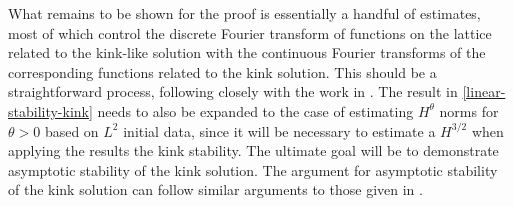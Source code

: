 What remains to be shown for the proof is essentially a handful of estimates, most of which control the discrete Fourier transform of functions on the lattice related to the kink-like solution with the continuous Fourier transforms of the corresponding functions related to the kink solution. This should be a straightforward process, following closely with the work in \cite{mizumachi2013asymptotic}. The result in \cref{linear-stability-kink} needs to also be expanded to the case of estimating \(H^\theta\) norms for \(\theta > 0\) based on \(L^2\) initial data, since it will be necessary to estimate a \(H^{3/2}\) when applying the results the kink stability. The ultimate goal will be to demonstrate asymptotic stability of the kink solution. The argument for asymptotic stability of the kink solution can follow similar arguments to those given in \cite{friesecke2002solitary,mizumachi2009asymptotic}.
